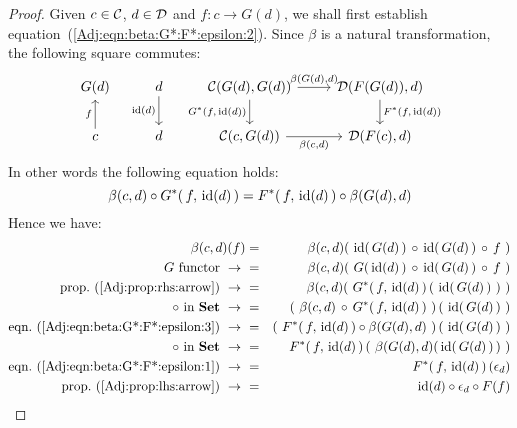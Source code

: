 \noindent
\begin{proof}
    Given $c\in\mbox{$\cal C$}$, $d\in\mbox{$\cal D$}$ and $f:c\to G(d)$, we shall first establish 
    equation~(\ref{Adj:eqn:beta:G*:F*:epsilon:2}). Since $\beta$
    is a natural transformation, the following square commutes:
        \[
            \begin{tikzcd}
                G(d)
                &d\arrow[d,swap, "{\rm id}(d)"]
                &\Cat(G(d),G(d))\arrow[r, "\beta\mbox{$(G(d),d)$}"]
                \arrow[d, swap,"G^{*}\mbox{$(f,\,{\rm id}(d))$}"]
                &\Dat(F(G(d)),d)
                \arrow[d, "F^{*}\mbox{$(f,\,{\rm id}(d))$}"]
                \\
                c\arrow[u, "f"]
                &d
                &\Cat(c,G(d))\arrow[r, swap, "\beta\mbox{$(c,d)$}"]
                &\Dat(F(c),d)
            \end{tikzcd}
        \]
    In other words the following equation holds: 
        \begin{equation}\label{Adj:eqn:beta:G*:F*:epsilon:3}
            \beta(c,d)\circ G^{*}(\,f,\,\mbox{\rm id}(d)\,) = 
            F^{*}(\,f,\,\mbox{\rm id}(d)\,)\circ\beta(G(d),d)
        \end{equation}
    Hence we have:
        \begin{eqnarray*}\beta(c,d)(f)
            &=&\beta(c,d)(\ \id(\,G(d)\,)\,\circ\,\id(\,G(d)\,)\,\circ\,f\ )\\
            \mbox{$G$ functor}\ \to\ 
            &=&\beta(c,d)(\ G(\,\id(d)\,)\,\circ\,\id(\,G(d)\,)\,\circ\,f\ )\\
            \mbox{prop.~(\ref{Adj:prop:rhs:arrow})}\ \to\ 
            &=&\beta(c,d)(\ G^{*}(\,f,\,\id(d)\,)\,(\ \id(\,G(d)\,)\ )\ )\\
            \mbox{$\circ$ in \Set}\ \to\ 
            &=&(\ \beta(c,d)\,\circ\,G^{*}(\,f,\,\id(d)\,)\ )\,(\ \id(\,G(d)\,)\ )\\
            \mbox{eqn.~(\ref{Adj:eqn:beta:G*:F*:epsilon:3})}\ \to\ 
            &=&(\ F^{*}(\,f,\,\id(d)\,)\circ\beta(G(d),d)\ )\,(\ \id(\,G(d)\,)\ )\\
            \mbox{$\circ$ in \Set}\ \to\ 
            &=&F^{*}(\,f,\,\id(d)\,)\,(\ \beta(G(d),d)(\,\id(\,G(d)\,)\,)\ )\\
            \mbox{eqn.~(\ref{Adj:eqn:beta:G*:F*:epsilon:1})}\ \to\ 
            &=&F^{*}(\,f,\,\id(d)\,)\,(\epsilon_{d})\\
            \mbox{prop.~(\ref{Adj:prop:lhs:arrow})}\ \to\ 
            &=&\id(d)\circ\epsilon_{d}\circ F(f)\\

\end{eqnarray*}
\end{proof}
